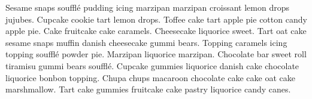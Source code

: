 Sesame snaps soufflé pudding icing marzipan marzipan croissant lemon drops jujubes. Cupcake cookie tart lemon drops. Toffee cake tart apple pie cotton candy apple pie. Cake fruitcake cake caramels. Cheesecake liquorice sweet. Tart oat cake sesame snaps muffin danish cheesecake gummi bears. Topping caramels icing topping soufflé powder pie. Marzipan liquorice marzipan. Chocolate bar sweet roll tiramisu gummi bears soufflé. Cupcake gummies liquorice danish cake chocolate liquorice bonbon topping. Chupa chups macaroon chocolate cake cake oat cake marshmallow. Tart cake gummies fruitcake cake pastry liquorice candy canes.